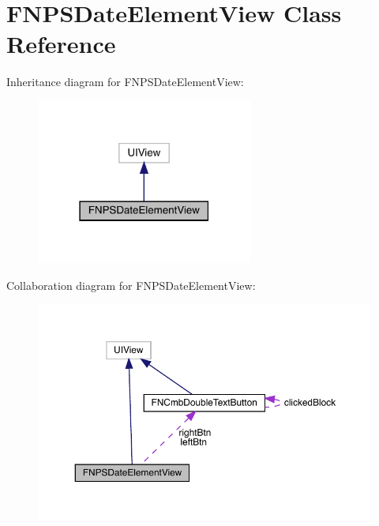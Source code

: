 \hypertarget{interface_f_n_p_s_date_element_view}{}\section{F\+N\+P\+S\+Date\+Element\+View Class Reference}
\label{interface_f_n_p_s_date_element_view}


Inheritance diagram for F\+N\+P\+S\+Date\+Element\+View\+:\nopagebreak
\begin{figure}[H]
\begin{center}
\leavevmode
\includegraphics[width=202pt]{interface_f_n_p_s_date_element_view__inherit__graph}
\end{center}
\end{figure}


Collaboration diagram for F\+N\+P\+S\+Date\+Element\+View\+:\nopagebreak
\begin{figure}[H]
\begin{center}
\leavevmode
\includegraphics[width=350pt]{interface_f_n_p_s_date_element_view__coll__graph}
\end{center}
\end{figure}
